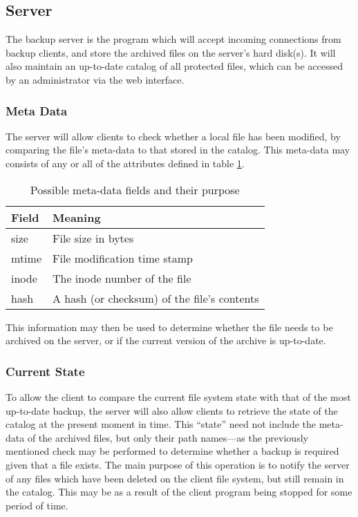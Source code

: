 \subsection{Server}

The backup server is the program which will accept incoming connections from
backup clients, and store the archived files on the server's hard disk(s).  It
will also maintain an up-to-date catalog of all protected files, which can be
accessed by an administrator via the web interface.

\subsubsection{Meta Data}

The server will allow clients to check whether a local file has been modified,
by comparing the file's meta-data to that stored in the catalog. This meta-data
may consists of any or all of the attributes defined in table
\ref{tab:meta-data}.

\begin{table}[h]
    \centering
    \begin{tabular}{ l l }
        \toprule
        Field       & Meaning
        \\ \midrule
        size        & File size in bytes
        \\
        mtime       & File modification time stamp
        \\
        inode       & The inode number of the file
        \\
        hash        & A hash (or checksum) of the file's contents
        \\ \bottomrule
    \end{tabular}
    \caption{Possible meta-data fields and their purpose}
    \label{tab:meta-data}
\end{table}

This information may then be used to determine whether the file needs to be
archived on the server, or if the current version of the archive is up-to-date.

\subsubsection{Current State}

To allow the client to compare the current file system state with that of the
most up-to-date backup, the server will also allow clients to retrieve the
state of the catalog at the present moment in time. This ``state'' need not
include the meta-data of the archived files, but only their path names---as the
previously mentioned check may be performed to determine whether a backup is
required given that a file exists. The main purpose of this operation is to
notify the server of any files which have been deleted on the client file
system, but still remain in the catalog. This may be as a result of the client
program being stopped for some period of time.

